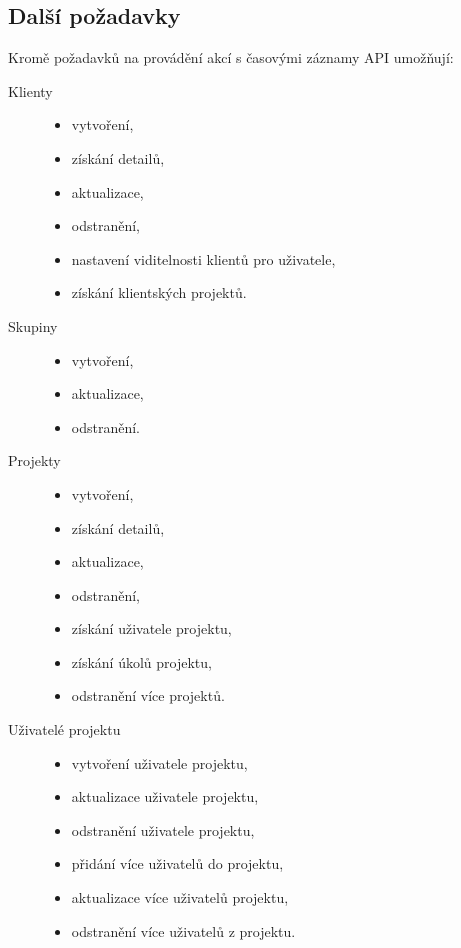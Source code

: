 \documentclass[thesis=B,czech]{FITthesis}[2012/06/26]
\begin{document}
\subsection{Další požadavky}
	Kromě požadavků na provádění akcí s časovými záznamy API umožňují:
	\begin{description}
		\item[Klienty] \hspace*{\fill} 
		\begin{itemize} 
			\item vytvoření,
			\item získání detailů,
			\item aktualizace,
			\item odstranění,
			\item nastavení viditelnosti klientů pro uživatele, 
			\item získání klientských projektů.
		\end{itemize}	
		
		\item[Skupiny] \hspace*{\fill} 
		\begin{itemize} 
			\item vytvoření,
			\item aktualizace,
			\item odstranění.
		\end{itemize}	
	
		\item[Projekty] \hspace*{\fill} 
		\begin{itemize} 
			\item vytvoření,
			\item získání detailů,
			\item aktualizace,
			\item odstranění,
			\item získání uživatele projektu,
			\item získání úkolů projektu,
			\item odstranění více projektů.
		\end{itemize}
	
		\item[Uživatelé projektu] \hspace*{\fill} 
		\begin{itemize} 
			\item vytvoření uživatele projektu,
			\item aktualizace uživatele projektu,
			\item odstranění uživatele projektu,
			\item přidání více uživatelů do projektu,
			\item aktualizace více uživatelů projektu,
			\item odstranění více uživatelů z projektu.
		\end{itemize}
		

\end{description}
\end{document}
